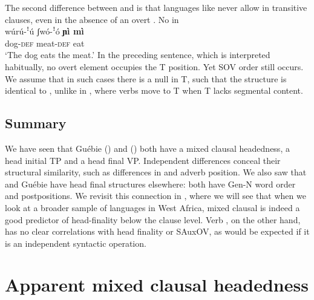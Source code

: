 \documentclass[output=paper,newtxmath,modfonts,nonflat,draftmode]{langsci/langscibook}
\begin{document}
The second difference between  and  is that  languages like  never allow  in transitive clauses, even in the absence of an overt . %
\ea No  in \\
\gll wúrú-ꜝú {} {ʃwó-ꜝó} \textbf{{ɲì mì}} \\
{dog}-\textsc{def} {} meat-\textsc{def} eat\\
\glt `The dog eats the meat.'
\z
In the preceding sentence, which is interpreted habitually, no overt  element occupies the T position. Yet SOV order still occurs. We assume that in such cases there is a null  in T, such that the structure is identical to , unlike in , where verbs move to T when T lacks segmental content.

\subsection{Summary}

We have seen that Guébie () and  () both have a mixed clausal headedness, a head initial TP and a head final VP. Independent differences conceal their structural similarity, such as differences in  and adverb position. We also saw that  and Guébie have head final structures elsewhere: both have Gen-N word order and postpositions. We revisit this connection in , where we will see that when we look at a broader sample of languages in West Africa, mixed clausal  is indeed a good predictor of head-finality below the clause level. Verb , on the other hand, has no clear correlations with head finality or SAuxOV, as would be expected if it is an independent syntactic operation.

\section{Apparent mixed clausal headedness} 
\label{sec:fake}
\end{document}
